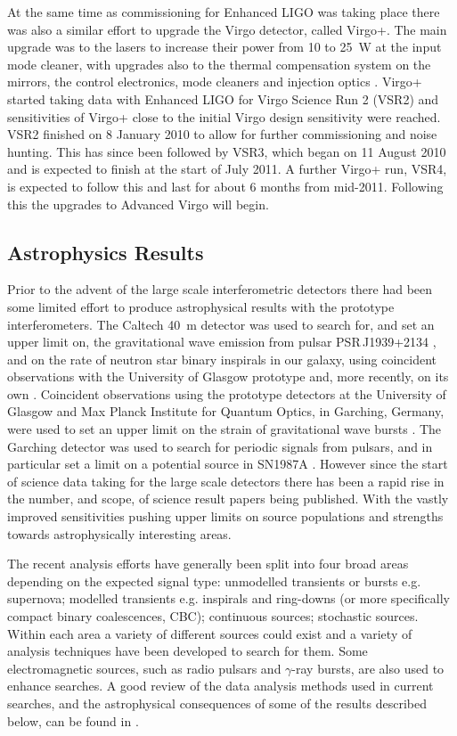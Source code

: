 \documentclass{article}
\begin{document}
At the same time as commissioning for Enhanced LIGO was taking place there was
also a similar effort to upgrade the Virgo detector, called Virgo+. The main
upgrade was to the lasers to increase their power from 10 to 25~W at the input
mode cleaner, with upgrades also to the thermal compensation system on the
mirrors, the control electronics, mode cleaners and injection optics
\cite{Acernese:2008b, AdVwhitepaper}. Virgo+ started taking data with Enhanced
LIGO for Virgo Science Run 2 (VSR2) and sensitivities of Virgo+ close to the
initial Virgo design sensitivity were reached. VSR2 finished on 8 January 2010
to allow for further commissioning and noise hunting. This has since been
followed by VSR3, which began on 11 August 2010 and is expected to finish at the
start of July 2011. A further Virgo+ run, VSR4, is expected to follow this and
last for about 6 months from mid-2011. Following this the upgrades to Advanced
Virgo will begin.

\subsection{Astrophysics Results}\label{subsection:results}
Prior to the advent of the large scale interferometric detectors there had been
some limited effort to produce astrophysical results with the prototype
interferometers. The Caltech 40~m detector was used to search for, and set an
upper limit on, the gravitational wave emission from pulsar PSR\,J1939+2134
\cite{Hereld:1984}, and on the rate of neutron star binary inspirals in our
galaxy, using coincident observations with the University of Glasgow prototype
\cite{Smith:1988} and, more recently, on its own \cite{Allen:1999}. Coincident
observations using the prototype detectors at the University of Glasgow and Max
Planck Institute for Quantum Optics, in Garching, Germany, were used to set an
upper limit on the strain of gravitational wave bursts \cite{Nicholson:1996}.
The Garching detector was used to search for periodic signals from pulsars, and
in particular set a limit on a potential source in SN1987A \cite{Niebauer:1993}.
However since the start of science data taking for the large scale detectors
there has been a rapid rise in the number, and scope, of science result papers
being published. With the vastly improved sensitivities pushing upper limits on
source populations and strengths towards astrophysically interesting areas.

The recent analysis efforts have generally been split into four broad areas
depending on the expected signal type: unmodelled transients or bursts e.g.
supernova; modelled transients e.g. inspirals and ring-downs (or more
specifically compact binary coalescences, CBC); continuous sources; stochastic
sources. Within each area a variety of different sources could exist and a
variety of analysis techniques have been developed to search for them. Some
electromagnetic sources, such as radio pulsars and $\gamma$-ray bursts, are also
used to enhance searches. A good review of the data analysis methods used in
current searches, and the astrophysical consequences of some of the results
described below, can be found in \cite{Sathyaprakash:2009}.
\end{document}
